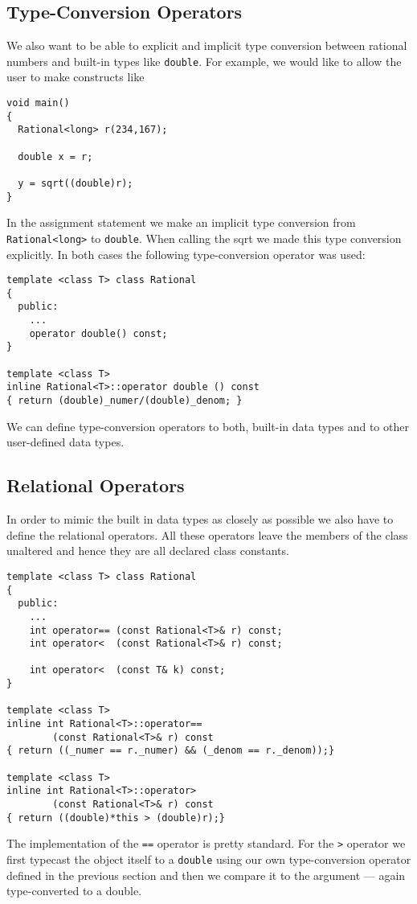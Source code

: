 \subsection{Type-Conversion Operators \label{secADTTemplatesTypeconv}}

We also want to be able to explicit and implicit type conversion
between rational numbers and built-in types like \verb+double+.
For example, we would like to allow the user to make constructs
like
{\footnotesize\begin{verbatim}
void main()
{
  Rational<long> r(234,167);

  double x = r;

  y = sqrt((double)r);
}
\end{verbatim}}
In the assignment statement we make an implicit type conversion
from \verb+Rational<long>+ to \verb+double+. When calling the
sqrt we made this type conversion explicitly. In both cases
the following type-conversion operator was used:
{\footnotesize \begin{verbatim}
template <class T> class Rational
{
  public:
    ...
    operator double() const;
}

template <class T>
inline Rational<T>::operator double () const
{ return (double)_numer/(double)_denom; }
\end{verbatim}}
We can define type-conversion operators to both, built-in data types
and to other user-defined data types.


\subsection{Relational Operators}

In order to mimic the built in data types as closely as possible we also
have to define the relational operators. All these operators leave the
members of the class unaltered and hence they are all declared class
constants.
{\footnotesize \begin{verbatim}
template <class T> class Rational
{
  public:
    ...
    int operator== (const Rational<T>& r) const;
    int operator<  (const Rational<T>& r) const;

    int operator<  (const T& k) const;
}

template <class T>
inline int Rational<T>::operator==
        (const Rational<T>& r) const
{ return ((_numer == r._numer) && (_denom == r._denom));}

template <class T>
inline int Rational<T>::operator>
        (const Rational<T>& r) const
{ return ((double)*this > (double)r);}
\end{verbatim}}
The implementation of the \verb+==+ operator is pretty standard.
For the \verb+>+ operator we first typecast the object itself to a
\verb+double+  using our own type-conversion operator defined in 
the previous section and then we compare it to the argument 
--- again type-converted to a double.

